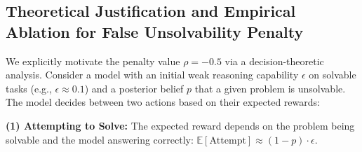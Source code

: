 \begin{table}[h]
\centering
{}
\caption{Detailed performance breakdown (S/U/M) across all seven datasets for different Penalty values at 40 steps.}
\label{tab:results_per_domain_app_}
\end{table}



\subsection{Theoretical Justification and Empirical Ablation for False Unsolvability Penalty}
\label{app:proof1}

We explicitly motivate the penalty value $\rho = -0.5$ via a decision-theoretic analysis. Consider a model with an initial weak reasoning capability $\epsilon$ on solvable tasks (e.g., $\epsilon \approx 0.1$) and a posterior belief $p$ that a given problem is unsolvable. The model decides between two actions based on their expected rewards:

\textbf{(1) Attempting to Solve:} The expected reward depends on the problem being solvable and the model answering correctly: $\mathbb{E}[\text{Attempt}] \approx (1-p) \cdot \epsilon$.

